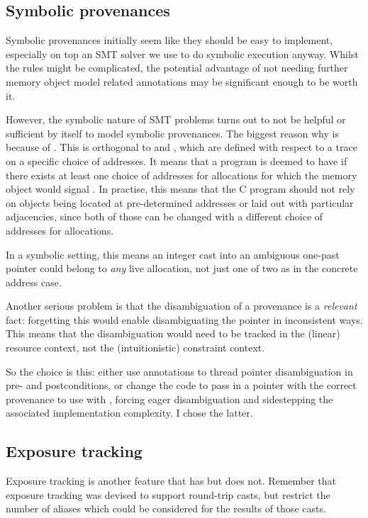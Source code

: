 \subsection{Symbolic provenances}

Symbolic provenances initially seem like they should be easy to implement,
especially on top an SMT solver we use to do symbolic execution anyway. Whilst
the rules might be complicated, the potential advantage of not needing further
memory object model related annotations may be significant enough to be worth
it.

However, the symbolic nature of SMT problems turns out to not be helpful or
sufficient by itself to model symbolic provenances. The biggest reason why is
because of . This is
orthogonal to  and , which are defined with respect to
a trace on a specific choice of addresses. It means that a program is deemed to
have  if there exists at least one choice of addresses for allocations
for which the memory object would signal . In practise, this means that
the C program should not rely on objects being located at pre-determined
addresses or laid out with particular adjacencies, since both of those can be
changed with a different choice of addresses for allocations.

In a symbolic setting, this means an integer cast into an ambiguous one-past
pointer could belong to \emph{any} live allocation, not just one of two as in
the concrete address case.

Another serious problem is that the disambiguation of a provenance is a
\emph{relevant} fact: forgetting this would enable disambiguating the pointer
in inconsistent ways. This means that the disambiguation would need to be
tracked in the (linear) resource context, not the (intuitionistic) constraint
context.

So the choice is this: either use annotations to thread pointer disambiguation in
pre- and postconditions, or change the code to pass in a pointer with the
correct provenance to use with , forcing eager
disambiguation and sidestepping the associated implementation complexity. I
chose the latter.

\subsection{Exposure tracking}

Exposure tracking is another feature that  has but 
does not. Remember that exposure tracking was devised to support round-trip
casts, but restrict the number of aliases which could be considered for the
results of those casts.

